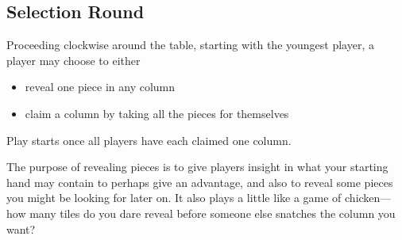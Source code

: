 \subsection{Selection Round}

Proceeding clockwise around the table, starting with the youngest player, a player may choose to either 
\begin{itemize} 
\item reveal one piece in any column
\item claim a column by taking all the pieces for themselves
\end{itemize}
Play starts once all players have each claimed one column.

\aside The purpose of revealing pieces is to give players insight in what your starting hand may contain to perhaps give an advantage, and also to reveal some pieces you might be looking for later on. It also plays a little like a game of chicken---how many tiles do you dare reveal before someone else snatches the column you want?